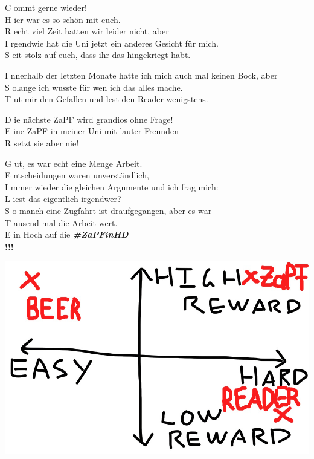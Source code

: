 
\vspace{4cm}

\begin{center}
  C ommt gerne wieder! \\
  H ier war es so schön mit euch. \\
  R echt viel Zeit hatten wir leider nicht, aber \\
  I rgendwie hat die Uni jetzt ein anderes Gesicht für mich. \\
  S eit stolz auf euch, dass ihr das hingekriegt habt.
\begin{center}

\end{center}
  I nnerhalb der letzten Monate hatte ich mich auch mal keinen Bock, aber \\
  S olange ich wusste für wen ich das alles mache. \\
  T ut mir den Gefallen und lest den Reader wenigstens.
\begin{center}

\end{center}
  D ie nächste ZaPF wird grandios ohne Frage! \\
  E ine ZaPF in meiner Uni mit lauter Freunden \\
  R setzt sie aber nie!
\begin{center}

\end{center}
  G ut, es war echt eine Menge Arbeit. \\
  E ntscheidungen waren unverständlich, \\
  I mmer wieder die gleichen Argumente und ich frag mich: \\
  L iest das eigentlich irgendwer? \\
  S o manch eine Zugfahrt ist draufgegangen, aber es war \\
  T ausend mal die Arbeit wert. \\
  E in Hoch auf die \textbf{\mbox{\textit{\#ZaPFinHD}}} \\

  \textbf{!!!}

  \vspace{1cm}
  \includegraphics[scale=0.2]{bilder/readergraphic.jpg}

\end{center}
